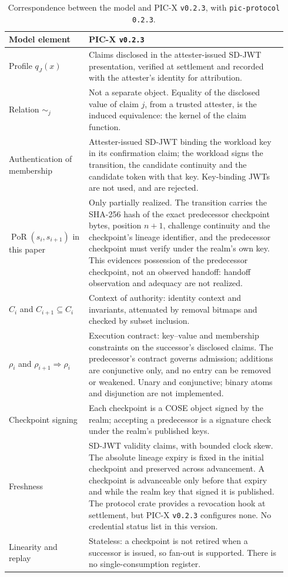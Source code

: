 \documentclass[10pt,twocolumn]{article}
\newcommand{\PoR}{\operatorname{PoR}}
\begin{document}
\begin{table}[t]
\centering
\small
\begin{tabular}{@{}p{0.27\linewidth}p{0.67\linewidth}@{}}
\toprule
Model element & PIC-X \texttt{v0.2.3} \\
\midrule
Profile \(q_J(x)\) &
Claims disclosed in the attester-issued SD-JWT presentation, verified at
settlement and recorded with the attester's identity for attribution. \\
Relation \(\sim_j\) &
Not a separate object. Equality of the disclosed value of claim \(j\), from a
trusted attester, is the induced equivalence: the kernel of the claim function. \\
Authentication of membership &
Attester-issued SD-JWT binding the workload key in its confirmation claim; the
workload signs the transition, the candidate continuity and the candidate token
with that key. Key-binding JWTs are not used, and are rejected. \\
\(\PoR(s_i,s_{i+1})\) in this paper &
Only partially realized. The transition carries the SHA-256 hash of the exact
predecessor checkpoint bytes, position \(n+1\), challenge continuity and the
checkpoint's lineage identifier, and the predecessor checkpoint must verify
under the realm's own key. This evidences possession of the predecessor
checkpoint, not an observed handoff: handoff observation and adequacy are not
realized. \\
\(C_i\) and \(C_{i+1}\subseteq C_i\) &
Context of authority: identity context and invariants, attenuated by removal
bitmaps and checked by subset inclusion. \\
\(\rho_i\) and \(\rho_{i+1}\Rightarrow\rho_i\) &
Execution contract: key--value and membership constraints on the successor's
disclosed claims. The predecessor's contract governs admission; additions are
conjunctive only, and no entry can be removed or weakened. Unary and
conjunctive; binary atoms and disjunction are not implemented. \\
Checkpoint signing &
Each checkpoint is a COSE object signed by the realm; accepting a predecessor is
a signature check under the realm's published keys. \\
Freshness &
SD-JWT validity claims, with bounded clock skew. The absolute lineage expiry is
fixed in the initial checkpoint and preserved across advancement. A checkpoint
is advanceable only before that expiry and while the realm key that signed it
is published. The protocol crate provides a revocation hook at settlement, but
PIC-X \texttt{v0.2.3} configures none. No credential status list in this
version. \\
Linearity and replay &
Stateless: a checkpoint is not retired when a successor is issued, so fan-out
is supported. There is no single-consumption register. \\
\bottomrule
\end{tabular}
\caption{Correspondence between the model and PIC-X \texttt{v0.2.3}, with
\texttt{pic-protocol} \texttt{0.2.3}.}
\label{tab:picx}
\end{table}
\end{document}
